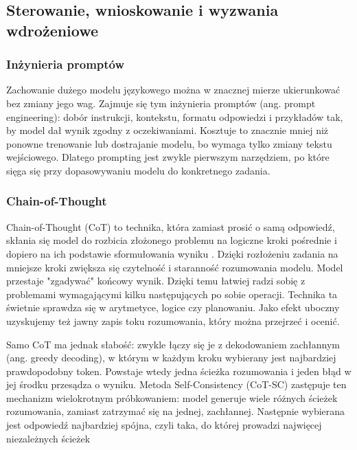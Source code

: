 \subsection{Sterowanie, wnioskowanie i wyzwania wdrożeniowe}

\subsubsection{Inżynieria promptów}

Zachowanie dużego modelu językowego można w znacznej mierze ukierunkować bez zmiany jego wag. Zajmuje się tym inżynieria promptów (ang. prompt engineering): dobór instrukcji, kontekstu, formatu odpowiedzi i przykładów tak, by model dał wynik zgodny z oczekiwaniami. Kosztuje to znacznie mniej niż ponowne trenowanie lub dostrajanie modelu, bo wymaga tylko zmiany tekstu wejściowego. Dlatego prompting jest zwykle pierwszym narzędziem, po które sięga się przy dopasowywaniu modelu do konkretnego zadania. 

\subsubsection{Chain-of-Thought}

Chain-of-Thought (CoT) to technika, która zamiast prosić o samą odpowiedź, skłania się model do rozbicia złożonego problemu na logiczne kroki pośrednie i dopiero na ich podstawie sformułowania wyniku \cite{llm_mas_techniques_and_business}. Dzięki rozłożeniu zadania na mniejsze kroki zwiększa się czytelność i staranność rozumowania modelu. Model przestaje "zgadywać" końcowy wynik. Dzięki temu łatwiej radzi sobię z problemami wymagającymi kilku następujących po sobie operacji. Technika ta świetnie sprawdza się w arytmetyce, logice czy planowaniu. Jako efekt uboczny uzyskujemy też jawny zapis toku rozumowania, który można przejrzeć i ocenić.

Samo CoT ma jednak słabość: zwykle łączy się je z dekodowaniem zachłannym (ang. greedy decoding), w którym w każdym kroku wybierany jest najbardziej prawdopodobny token. Powstaje wtedy jedna ścieżka rozumowania i jeden błąd w jej środku przesądza o wyniku. Metoda Self-Consistency (CoT-SC) zastępuje ten mechanizm wielokrotnym próbkowaniem: model generuje wiele różnych ścieżek rozumowania, zamiast zatrzymać się na jednej, zachłannej\cite{more_agents_is_all_you_need}\cite{self_consistency}. Następnie wybierana jest odpowiedź najbardziej spójna, czyli taka, do której prowadzi najwięcej niezależnych ścieżek

